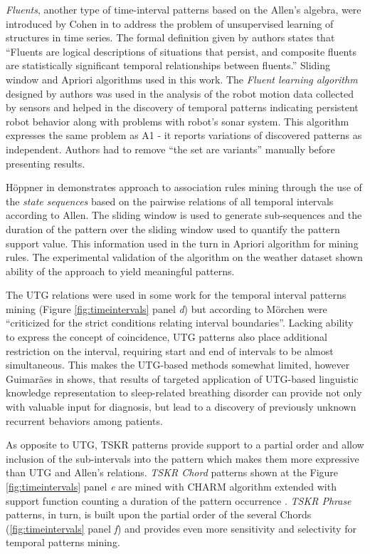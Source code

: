 \textit{Fluents}, another type of time-interval patterns based on the Allen's algebra, were introduced by Cohen in \cite{citeulike:5153756} to address the problem of unsupervised learning of structures in time series. The formal definition given by authors states that ``Fluents are logical descriptions of situations that persist, and composite fluents are statistically significant temporal relationships between fluents.'' Sliding window and Apriori algorithms used in this work. The \textit{Fluent learning algorithm} designed by authors was used in the analysis of the robot motion data collected by sensors and helped in the discovery of temporal patterns indicating persistent robot behavior along with problems with robot's sonar system. This algorithm expresses the same problem as A1 - it reports variations of discovered patterns as independent. Authors had to remove ``the set are variants'' manually before presenting results.

H\"{o}ppner in \cite{citeulike:5159615} demonstrates approach to association rules mining through the use of the \textit{state sequences} based on the pairwise relations of all temporal intervals according to Allen. The sliding window is used to generate sub-sequences and the duration of the pattern over the sliding window used to quantify the pattern support value. This information used in the turn in Apriori algorithm for mining rules. The experimental validation of the algorithm on the weather dataset shown ability of the approach to yield meaningful patterns.

The UTG relations were used in some work for the temporal interval patterns mining (Figure \ref{fig:timeintervals} panel \textit{d}) but according to M\"orchen \cite{citeulike:1748833} were ``criticized for the strict conditions relating interval boundaries''. Lacking ability to express the concept of coincidence, UTG patterns also place additional restriction on the interval, requiring start and end of intervals to be almost simultaneous. This makes the UTG-based methods somewhat limited, however Guimar\~{a}es in \cite{citeulike:5159924} shows, that results of targeted application of UTG-based linguistic knowledge representation to sleep-related breathing disorder can provide not only with valuable input for diagnosis, but lead to a discovery of previously unknown recurrent behaviors among patients.

As opposite to UTG, TSKR patterns provide support to a partial order and allow inclusion of the sub-intervals into the pattern which makes them more expressive than UTG and Allen's relations. \textit{TSKR Chord} patterns shown at the Figure \ref{fig:timeintervals} panel \textit{e} are mined with CHARM \cite{citeulike:769773} algorithm extended with support function counting a duration of the pattern occurrence \cite{citeulike:1748833}. \textit{TSKR Phrase} patterns, in turn, is built upon the partial order of the several Chords (\ref{fig:timeintervals} panel \textit{f}) and provides even more sensitivity and selectivity for temporal patterns mining.
